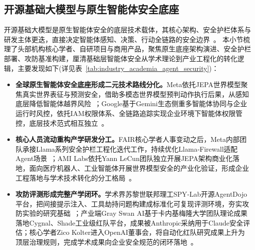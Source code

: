 \subsection{开源基础大模型与原生智能体安全底座}
开源基础大模型是原生智能体安全的底层技术载体，其核心架构、安全护栏体系与研发主体更迭，直接决定智能体感知、决策、行动全链路的安全边界~\cite{nyuLeCun2026,googleGeminiEnterpriseAgentPlatform2026}。
本小节梳理了头部机构核心学者、自研项目与商用产品，聚焦原生底座架构演进、安全护栏部署、攻防基准构建，厘清基础层智能体安全从学术理论到产业工程化的转化逻辑，主要发现如下(详见表~\ref{tab:industry_academia_agent_security})：
\begin{itemize}[tabitem]
    \item \textbf{全球原生智能体安全底座形成二元技术路线分化。}Meta依托JEPA世界模型聚焦真实世界表征与预测安全，借助多模态世界模型预判动作执行后果，从感知底层降低智能体越界风险~\cite{nyuLeCun2026,vjepa2025}；Google基于Gemini生态侧重多智能体协同与企业运行时风控，依托IAM权限体系、全链路追踪实现企业环境下智能体权限管控，底层技术范式相互独立~\cite{googleADK2025,deepmindCoScientist2025}。

    \item \textbf{核心人员流动重构产学研发分工。}FAIR核心学者人事变动之后，Meta内部团队承接Llama系列安全护栏工程化迭代工作，持续优化Llama‑Firewall适配Agent场景~\cite{pineauDeparture2025,metaLlamaFirewall2025}；AMI Labs依托Yann LeCun团队独立开展JEPA架构商业化落地，面向医疗机器人、工业智能体开展世界模型安全的产业化验证，形成企业工程落地与学术技术转化的分工格局~\cite{amiLabsFunding2026,lejepaIdentifiability2026}。

    \item \textbf{攻防评测形成完整产学闭环。}学术界苏黎世联邦理工SPY‑Lab开源AgentDojo平台，把间接提示注入、工具劫持问题构建成标准化可复现评测环境，夯实攻防实验的研究基础~\cite{agentdojoGithub2026}；产业端Gray Swan AI基于卡内基梅隆大学团队理论成果落地Cygnal、Shade工业级红队平台，成果被Anthropic采纳用于Claude安全评估；核心学者Zico Kolter进入OpenAI董事会，将自动化红队研究成果上升为顶层治理规则，完成学术成果向企业安全规范的闭环落地~\cite{latentspaceGrayswan2026,kolterWikipedia2026}。
\end{itemize}

\begingroup
\enlargethispage{1cm}
\footnotesize
\centering

